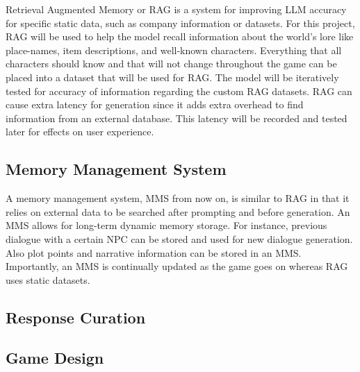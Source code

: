\documentclass[10pt,twocolumn]{article}
\begin{document}
            \par 
            Retrieval Augmented Memory or RAG is a system for improving LLM accuracy for specific static data, such as company information or datasets. For this project, RAG will be used to help the model recall information about the world's lore like place-names, item descriptions, and well-known characters. Everything that all characters should know and that will not change throughout the game can be placed into a dataset that will be used for RAG. The model will be iteratively tested for accuracy of information regarding the custom RAG datasets. RAG can cause extra latency for generation since it adds extra overhead to find information from an external database. This latency will be recorded and tested later for effects on user experience. 

        \subsection{Memory Management System}

            \par 
            A memory management system, MMS from now on, is similar to RAG in that it relies on external data to be searched after prompting and before generation. An MMS allows for long-term dynamic memory storage. For instance, previous dialogue with a certain NPC can be stored and used for new dialogue generation. Also plot points and narrative information can be stored in an MMS. Importantly, an MMS is continually updated as the game goes on whereas RAG uses static datasets. 

        \subsection{Response Curation}

            \par 
            

    \subsection{Game Design}

        \par
        

        \subsubsection{}

            \par
\end{document}
